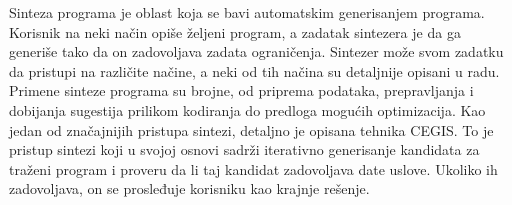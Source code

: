\abstract

Sinteza programa je oblast koja se bavi automatskim generisanjem programa. Korisnik na neki način opiše željeni program, a zadatak sintezera je da ga generiše tako da on zadovoljava zadata ograničenja. Sintezer može svom zadatku da pristupi na različite načine, a neki od tih načina su detaljnije opisani u radu. Primene sinteze programa su brojne, od priprema podataka, prepravljanja i dobijanja sugestija prilikom kodiranja do predloga mogućih optimizacija. Kao jedan od značajnijih pristupa sintezi, detaljno je opisana tehnika CEGIS. To je pristup sintezi koji u svojoj osnovi sadrži iterativno generisanje kandidata za traženi program i proveru da li taj kandidat zadovoljava date uslove. Ukoliko ih zadovoljava, on se prosleđuje korisniku kao krajnje rešenje.
